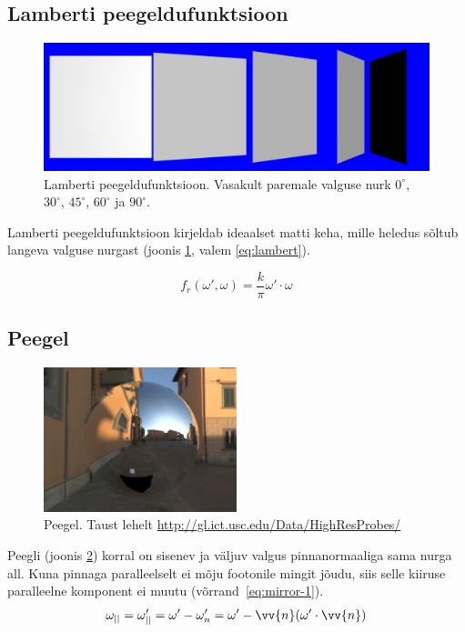 \documentclass[a4paper,12pt]{report}
\renewcommand{\vec}[1]{\vv{#1}}
\begin{document}
\subsection{Lamberti peegeldufunktsioon}
\begin{figure}
\includegraphics[width=\textwidth]{lambert}
\caption[Lamberti peegeldufunktsioon]{Lamberti peegeldufunktsioon.
Vasakult paremale valguse nurk \(0^\circ\), \(30^\circ\), \(45^\circ\),
\(60^\circ\) ja \(90^\circ\).}
\label{fig:lambert}
\end{figure}
Lamberti peegeldufunktsioon kirjeldab ideaalset matti keha, mille heledus
sõltub langeva valguse nurgast (joonis \ref{fig:lambert}, valem \ref{eq:lambert}).

\begin{equation} \label{eq:lambert}
f_r(\omega', \omega) = \frac k\pi \omega' \cdot \omega
\end{equation}

\subsection{Peegel} 
\label{subsec:peegel}
\begin{figure}
\includegraphics[width=0.499\textwidth]{mirror}
\caption[Peegel]{Peegel. Taust lehelt \url{http://gl.ict.usc.edu/Data/HighResProbes/}}
\label{fig:mirror}
\end{figure}

Peegli (joonis \ref{fig:mirror}) korral on sisenev ja väljuv valgus pinnanormaaliga sama nurga all.
Kuna pinnaga paralleelselt ei mõju footonile mingit jõudu, siis selle
kiiruse paralleelne komponent ei muutu (võrrand~\ref{eq:mirror-1}).
\begin{equation} \label{eq:mirror-1}
\omega_{||} = \omega'_{||} = \omega' - \omega'_{n} = \omega' -\vec n(\omega'\cdot\vec n)
\end{equation}
\end{document}
